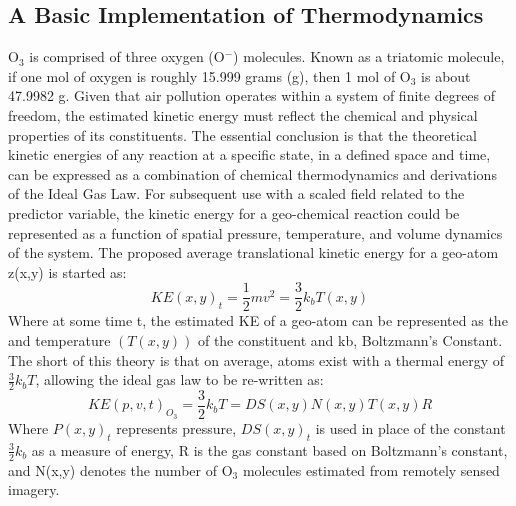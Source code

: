 \subsection{A Basic Implementation of Thermodynamics} \label{methods:thermo} O$_3$ is comprised of three oxygen (O$^{-}$) molecules. Known as a triatomic molecule, if one mol of oxygen is roughly 15.999 grams (g), then 1 mol of O$_3$ is about 47.9982 g. Given that air pollution operates within a system of finite degrees of freedom, the estimated kinetic energy must reflect the chemical and physical properties of its constituents. The essential conclusion is that the theoretical kinetic energies of any reaction at a specific state, in a defined space and time, can be expressed as a combination of chemical thermodynamics and derivations of the Ideal Gas Law. For subsequent use with a scaled field related to the predictor variable, the kinetic energy for a geo-chemical reaction could be represented as a function of spatial pressure, temperature, and volume dynamics of the system. The proposed average translational kinetic energy for a geo-atom z(x,y) is started as:
\[
{KE(x,y)}_t=\frac{1}{2}mv^2=\frac{3}{2}k_bT(x,y)
\]
Where at some time t, the estimated KE of a geo-atom can be represented as the and temperature $(T(x,y))$ of the constituent and kb, Boltzmann’s Constant. The short of this theory is that on average, atoms exist with a thermal energy of $\frac{3}{2}k_bT$, allowing the ideal gas law to be re-written as:
\[
KE\left(p,v,t\right)_{O_3}=\frac{3}{2}k_bT=DS\left(x,y\right)N\left(x,y\right)T(x,y)R
\]
Where ${P(x,y)}_t$ represents pressure, ${DS(x,y)}_t$ is used in place of the constant $\frac{3}{2}k_b$ as a measure of energy, R is the gas constant based on Boltzmann’s constant, and N(x,y) denotes the number of O$_3$ molecules estimated from remotely sensed imagery.
